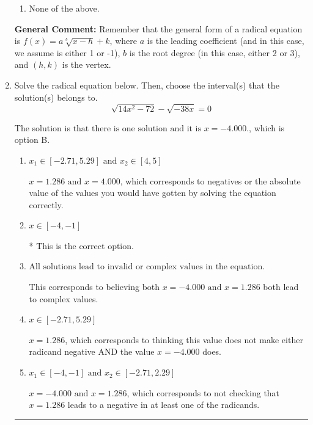 \documentclass{extbook}[14pt]
\newcommand{\litem}[1]{\item #1

\rule{\textwidth}{0.4pt}}
\begin{document}
\begin{enumerate}
{\begin{enumerate}[label=\Alph*.]
\item None of the above.\end{enumerate}
\textbf{General Comment:} Remember that the general form of a radical equation is $ f(x) = a \sqrt[b]{x - h} + k $, where $a$ is the leading coefficient (and in this case, we assume is either 1 or -1), $b$ is the root degree (in this case, either 2 or 3), and $(h, k)$ is the vertex.
}
\litem{
Solve the radical equation below. Then, choose the interval(s) that the solution(s) belongs to.
\[ \sqrt{14 x^2 - 72} - \sqrt{-38 x} = 0 \]

The solution is \( \text{that there is one solution and it is } x = -4.000. \), which is option B.\begin{enumerate}[label=\Alph*.]
\item \( x_1 \in [-2.71, 5.29] \text{ and } x_2 \in [4,5] \)

$x = 1.286 \text{ and } x = 4.000$, which corresponds to negatives or the absolute value of the values you would have gotten by solving the equation correctly.
\item \( x \in [-4,-1] \)

* This is the correct option.
\item \( \text{All solutions lead to invalid or complex values in the equation.} \)

This corresponds to believing both $x = -4.000 \text{ and } x = 1.286$ both lead to complex values.
\item \( x \in [-2.71,5.29] \)

$x = 1.286$, which corresponds to thinking this value does not make either radicand negative AND the value $x = -4.000$ does.
\item \( x_1 \in [-4, -1] \text{ and } x_2 \in [-2.71,2.29] \)

$x = -4.000 \text{ and } x = 1.286$, which corresponds to not checking that $x = 1.286$ leads to a negative in at least one of the radicands.
\end{enumerate}

}
\end{enumerate}
\end{document}
